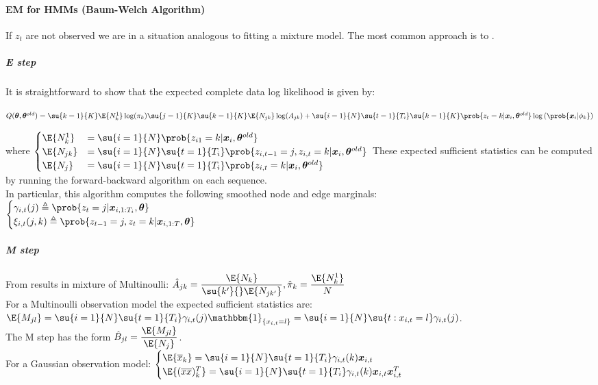 \paragraph{EM for HMMs (Baum-Welch Algorithm)}
If $z_{t}$ are not observed we are in a situation analogous to fitting a mixture model.
The most common approach is to .

\subparagraph{E step}
It is straightforward to show that the expected complete data log likelihood is given by:
\begin{center}
    $Q(\bm{\theta},\bm{\theta}^{old}) = \su{k=1}{K}\E{N^{1}_{k}}\log(\pi_{k}) \su{j=1}{K}\su{k=1}{K}
        \E{N_{jk}}\log(A_{jk}) + \su{i=1}{N}\su{t=1}{T_{i}}\su{k=1}{K}\prob{z_{t}=k|\bm{x}_{i},
        \bm{\theta}^{old}}\log\left(\prob{\bm{x}_{i}|\phi_{k}}\right)$
\end{center}
where 
$\begin{cases}
    \E{N^{1}_{k}} &= \su{i=1}{N}\prob{z_{i1}=k|\bm{x}_{i},\bm{\theta}^{old}} \\
    \E{N_{jk}} &= \su{i=1}{N}\su{t=1}{T_{i}}\prob{z_{i,t-1}=j,z_{i,t}=k|\bm{x}_{i},\bm{\theta}^{
    old}} \\
            \E{N_{j}} &= \su{i=1}{N}\su{t=1}{T_{i}}\prob{z_{i,t}=k|\bm{x}_{i},\bm{\theta}^{old}}
\end{cases}$
These expected sufficient statistics can be computed by running the forward-backward algorithm on 
each sequence.\\
In particular, this algorithm computes the following smoothed node and edge marginals:\\
$\begin{cases}
    \gamma_{i,t}(j) \triangleq \prob{z_{t}=j|\bm{x}_{i,1:T_{i}},\bm{\theta}} \\
    \xi_{i,t}(j,k) \triangleq \prob{z_{t-1}=j,z_{t}=k|\bm{x}_{i,1:T},\bm{\theta}}
\end{cases}$

\subparagraph{M step}
From results in mixture of Multinoulli:
$\hat{A}_{jk} = \dfrac{\E{N_{k}}}{\su{k'}{}\E{N_{jk'}}}, \hat{\pi}_{k}=\dfrac{\E{N^{1}_{k}}}{N}$\\
For a Multinoulli observation model the expected sufficient statistics are:
$\E{M_{jl}} = \su{i=1}{N}\su{t=1}{T_{i}}\gamma_{i,t}(j)\mathbbm{1}_{\{x_{i,t}=l\}} = 
\su{i=1}{N}\su{t:x_{i,t}=l}\gamma_{i,t}(j)$.\\
The M step has the form $\hat{B}_{jl} = \dfrac{\E{M_{jl}}}{\E{N_{j}}}$.\\
For a Gaussian observation model:
$\begin{cases}
    \E{\overline{x}_{k}} = \su{i=1}{N}\su{t=1}{T_{i}}\gamma_{i,t}(k)\bm{x}_{i,t} \\
    \E{(\overline{x}\overline{x})^{T}_{k}} = \su{i=1}{N}\su{t=1}{T_{i}}\gamma_{i,t}(k)\bm{x}_{i,t}
    \bm{x}^{T}_{i,t}
\end{cases}$

